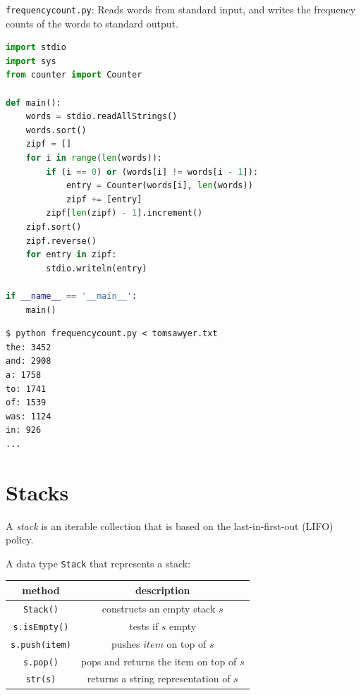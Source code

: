 \documentclass[8pt,a4paper,compress,handout]{beamer}
\begin{document}
\begin{frame}[fragile]
\begin{framed}
\tiny \lstinline{frequencycount.py}: Reads words from standard input, and writes the frequency counts of the words to standard output.
\end{framed}

\begin{lstlisting}[language=Python]
import stdio
import sys
from counter import Counter

def main():
    words = stdio.readAllStrings()
    words.sort()
    zipf = []
    for i in range(len(words)):
        if (i == 0) or (words[i] != words[i - 1]):
            entry = Counter(words[i], len(words))
            zipf += [entry]
        zipf[len(zipf) - 1].increment()
    zipf.sort()
    zipf.reverse()
    for entry in zipf:
        stdio.writeln(entry)

if __name__ == '__main__':
    main()
\end{lstlisting}

\begin{lstlisting}[language={}]
$ python frequencycount.py < tomsawyer.txt
the: 3452
and: 2908
a: 1758
to: 1741
of: 1539
was: 1124
in: 926
...
\end{lstlisting}
\end{frame}

\section{Stacks}
\begin{frame}[fragile]
A \emph{stack} is an iterable collection that is based on the last-in-first-out (LIFO) policy.

\bigskip

A data type \lstinline{Stack} that represents a stack:
\begin{center}
\begin{tabular}{cc}
method & description \\ \hline
\lstinline$Stack()$ & constructs an empty stack $s$ \\
\lstinline$s.isEmpty()$ & tests if $s$ empty \\
\lstinline$s.push(item)$ & pushes $item$ on top of $s$ \\
\lstinline$s.pop()$ &  pops and returns the item on top of $s$ \\
\lstinline$str(s)$ & returns a string representation of $s$
\end{tabular} 
\end{center}
\end{frame}
\end{document}
